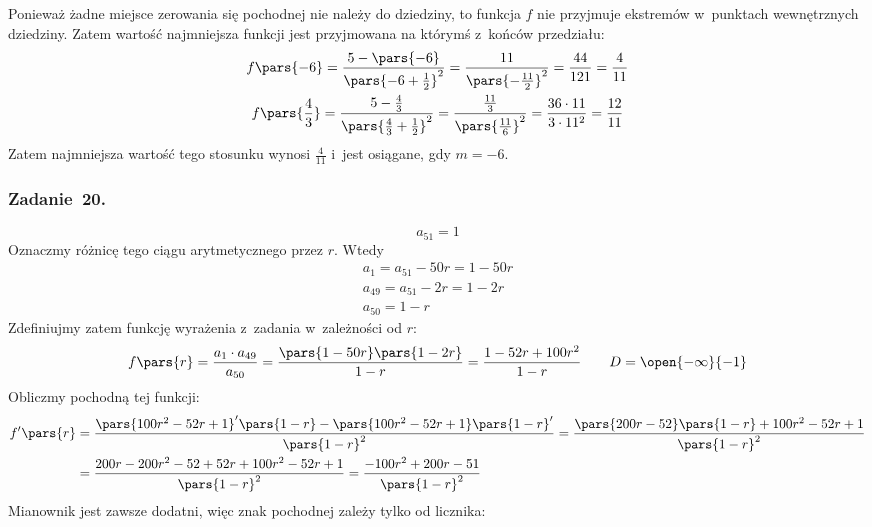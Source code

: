 Ponieważ żadne miejsce zerowania się pochodnej nie należy do dziedziny, to funkcja \(f\) nie przyjmuje ekstremów w~punktach wewnętrznych dziedziny. Zatem wartość najmniejsza funkcji jest przyjmowana na którymś z~końców przedziału:
\begin{gather*}
    f\pars{-6}
        = \frac{5 - \pars{-6}}{\pars{-6 + \frac{1}{2}}^2}
        = \frac{11}{\pars{-\frac{11}{2}}^2}
        = \frac{44}{121}
        = \frac{4}{11}\\
    f\pars{\frac{4}{3}}
        = \frac{5 - \frac{4}{3}}{\pars{\frac{4}{3} + \frac{1}{2}}^2}
        = \frac{\frac{11}{3}}{\pars{\frac{11}{6}}^2}
        = \frac{36 \cdot 11}{3 \cdot 11^2}
        = \frac{12}{11}
\end{gather*}
Zatem najmniejsza wartość tego stosunku wynosi \(\frac{4}{11}\) i~jest osiągane, gdy \(m = -6\).
\subsubsection*{Zadanie~20.}
\begin{equation*}
    a_{51} = 1
\end{equation*}
Oznaczmy różnicę tego ciągu arytmetycznego przez \(r\). Wtedy
\begin{gather*}
    a_1
        = a_{51} - 50r
        = 1 - 50r\\
    a_{49}
        = a_{51} - 2r
        = 1 - 2r\\
    a_{50}
        = 1 - r
\end{gather*}
Zdefiniujmy zatem funkcję wyrażenia z~zadania w~zależności od \(r\):
\begin{equation*}
    f\pars{r}
        = \frac{a_1 \cdot a_{49}}{a_{50}}
        = \frac{\pars{1 - 50r}\pars{1 - 2r}}{1 - r}
        = \frac{1 - 52r + 100r^2}{1 - r} \qquad D = \open{-\infty}{-1}
\end{equation*}
Obliczmy pochodną tej funkcji:
\begin{equation*}
    \begin{split}
        f'\pars{r}
            &= \frac{\pars{100r^2 - 52r + 1}'\pars{1 - r} - \pars{100r^2 - 52r + 1}\pars{1 - r}'}{\pars{1 - r}^2}
            = \frac{\pars{200r - 52}\pars{1 - r} + 100r^2 - 52r + 1}{\pars{1 - r}^2}\\
            &= \frac{200r - 200r^2 - 52 + 52r + 100r^2 - 52r + 1}{\pars{1 - r}^2}
            = \frac{-100r^2 + 200r - 51}{\pars{1 - r}^2}
    \end{split}
\end{equation*}
Mianownik jest zawsze dodatni, więc znak pochodnej zależy tylko od licznika:
